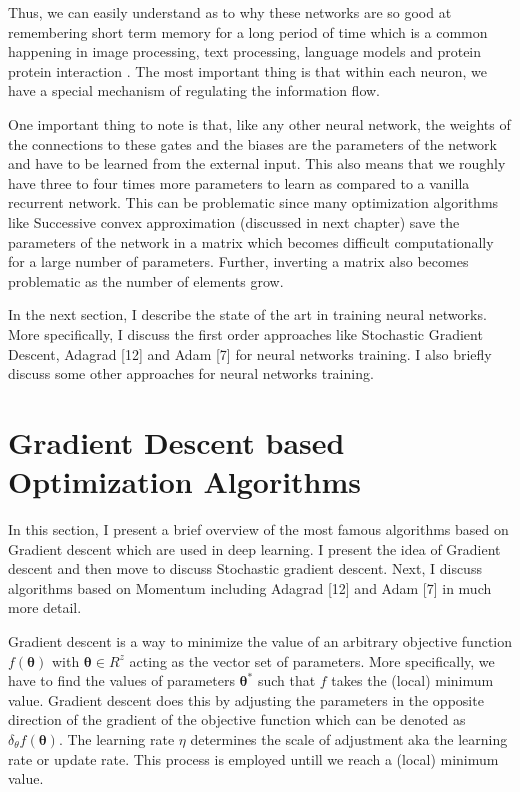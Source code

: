 Thus, we can easily understand as to why these networks are so good at remembering short term memory for a long period of time which is a common happening in image processing, text processing, language models and protein protein interaction . The most important thing is that within each neuron, we have a special mechanism of regulating the information flow. 

One important thing to note is that, like any other neural network, the weights of the connections to these gates and the biases are the parameters of the network and have to be learned from the external input. This also means that we roughly have three to four times more parameters to learn as compared to a vanilla recurrent network. This can be problematic since many optimization algorithms like Successive convex approximation (discussed in next chapter) save the parameters of the network in a matrix which becomes difficult computationally for a large number of parameters. Further, inverting a matrix also becomes problematic as the number of elements grow.     

In the next section, I describe the state of the art in training neural networks. More specifically, I discuss the first order approaches like Stochastic Gradient Descent, Adagrad [12] and Adam [7] for neural networks training. I also briefly discuss some other approaches for neural networks training. 

\section {Gradient Descent based Optimization Algorithms}

In this section, I present a brief overview of the most famous algorithms based on Gradient descent which are used in deep learning. I present the idea of Gradient descent and then move to discuss Stochastic gradient descent. Next, I discuss algorithms based on Momentum including Adagrad [12] and Adam [7] in much more detail.

Gradient descent is a way to minimize the value of an arbitrary objective function $f(\bm{\theta})$ with 
$\bm{\theta} \in R^z$ acting as the vector set of parameters. More specifically, we have to find the values of parameters $\bm{\theta}^*$ such that $f$ takes the (local) minimum value. Gradient descent does this by adjusting the parameters in the opposite direction of the gradient of the objective function which can be denoted as $\delta_\theta f(\bm{\theta})$. The learning rate $\eta$ determines the scale of adjustment aka the learning rate or update rate. This process is employed untill we reach a (local) minimum value.

